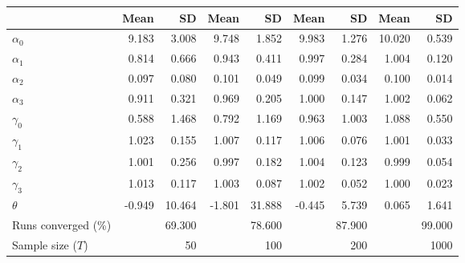 
\begin{tabular}[t]{lrrrrrrrr}
\toprule
  & Mean & SD & Mean  & SD  & Mean   & SD   & Mean    & SD   \\
\midrule
$\alpha_{0}$ & 9.183 & 3.008 & 9.748 & 1.852 & 9.983 & 1.276 & 10.020 & 0.539\\
$\alpha_{1}$ & 0.814 & 0.666 & 0.943 & 0.411 & 0.997 & 0.284 & 1.004 & 0.120\\
$\alpha_{2}$ & 0.097 & 0.080 & 0.101 & 0.049 & 0.099 & 0.034 & 0.100 & 0.014\\
$\alpha_{3}$ & 0.911 & 0.321 & 0.969 & 0.205 & 1.000 & 0.147 & 1.002 & 0.062\\
$\gamma_{0}$ & 0.588 & 1.468 & 0.792 & 1.169 & 0.963 & 1.003 & 1.088 & 0.550\\
$\gamma_{1}$ & 1.023 & 0.155 & 1.007 & 0.117 & 1.006 & 0.076 & 1.001 & 0.033\\
$\gamma_{2}$ & 1.001 & 0.256 & 0.997 & 0.182 & 1.004 & 0.123 & 0.999 & 0.054\\
$\gamma_{3}$ & 1.013 & 0.117 & 1.003 & 0.087 & 1.002 & 0.052 & 1.000 & 0.023\\
$\theta$ & -0.949 & 10.464 & -1.801 & 31.888 & -0.445 & 5.739 & 0.065 & 1.641\\
Runs converged (\%) &  & 69.300 &  & 78.600 &  & 87.900 &  & 99.000\\
Sample size ($T$) &  & 50 &  & 100 &  & 200 &  & 1000\\
\bottomrule
\end{tabular}
